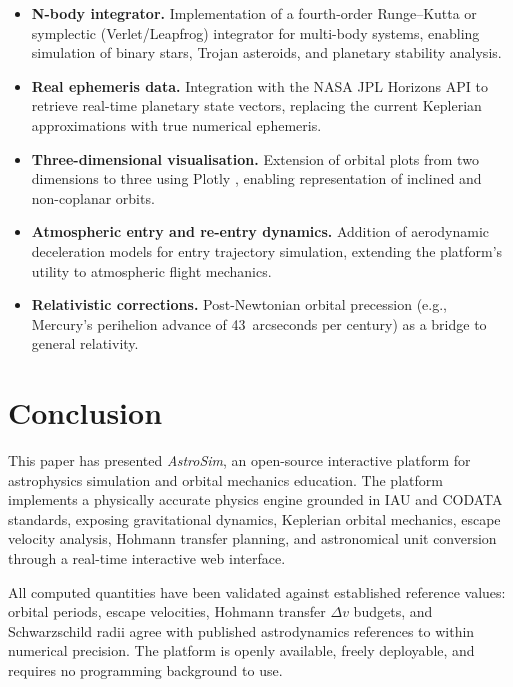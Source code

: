 \documentclass[10pt,a4paper]{article}
\begin{document}
\begin{itemize}
\item \textbf{N-body integrator.}
  Implementation of a fourth-order Runge--Kutta or symplectic (Verlet/Leapfrog)
  integrator \citep{hairer2006} for multi-body systems, enabling simulation of
  binary stars, Trojan asteroids, and planetary stability analysis.

\item \textbf{Real ephemeris data.}
  Integration with the NASA JPL Horizons API to retrieve real-time planetary
  state vectors, replacing the current Keplerian approximations with true
  numerical ephemeris.

\item \textbf{Three-dimensional visualisation.}
  Extension of orbital plots from two dimensions to three using Plotly
  \citep{plotly2015}, enabling representation of inclined and non-coplanar orbits.

\item \textbf{Atmospheric entry and re-entry dynamics.}
  Addition of aerodynamic deceleration models for entry trajectory simulation,
  extending the platform's utility to atmospheric flight mechanics.

\item \textbf{Relativistic corrections.}
  Post-Newtonian orbital precession (e.g., Mercury's perihelion advance of
  43~arcseconds per century) as a bridge to general relativity.
\end{itemize}

\section{Conclusion}

This paper has presented \textit{AstroSim}, an open-source interactive
platform for astrophysics simulation and orbital mechanics education.
The platform implements a physically accurate physics engine grounded in IAU
and CODATA standards, exposing gravitational dynamics, Keplerian orbital
mechanics, escape velocity analysis, Hohmann transfer planning, and
astronomical unit conversion through a real-time interactive web interface.

All computed quantities have been validated against established reference
values: orbital periods, escape velocities, Hohmann transfer $\Delta v$
budgets, and Schwarzschild radii agree with published astrodynamics references
to within numerical precision.
The platform is openly available, freely deployable, and requires no
programming background to use.
\end{document}
